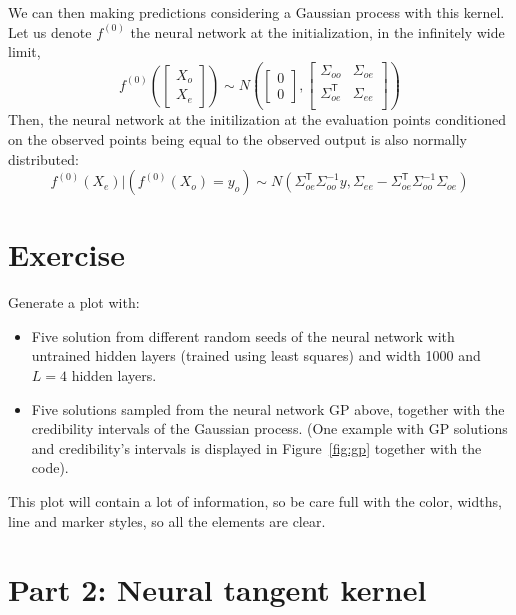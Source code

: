 \documentclass[a4paper,10pt]{article}
\newcommand{\trnsp}{\mathsf{T}}
\begin{document}
We can then making predictions considering a Gaussian process with this kernel. Let us denote $f^{(0)}$ the neural network at the initialization, in the infinitely wide limit,
\begin{equation}
\label{eq:nn-at-initialization}
f^{(0)}\left(\begin{bmatrix}
    X_o \\
    X_e
\end{bmatrix}\right)
\sim
N\left(\begin{bmatrix}
    0 \\
    0
\end{bmatrix}, \begin{bmatrix}
    \Sigma_{oo} & \Sigma_{oe} \\
    \Sigma_{oe}^\trnsp & \Sigma_{ee} \\
\end{bmatrix}\right)
\end{equation}
Then, the neural network at the initilization at the evaluation points conditioned on the observed points being equal to the observed output is also normally distributed:
$$f^{(0)}\left(
    X_e\right)
    | \left(f^{(0)}(  X_o) = y_o\right)
\sim
N\left(\Sigma_{oe}^\trnsp \Sigma_{oo}^{-1} y,
    \Sigma_{ee} - \Sigma_{oe}^\trnsp \Sigma_{oo}^{-1} \Sigma_{oe}\right)
$$

\section*{Exercise}
Generate a plot with:

\begin{itemize}
    \item Five solution from different random seeds of the neural network with untrained hidden layers (trained using least squares) and width 1000 and $L = 4$ hidden layers.
    \item Five solutions sampled from the neural network GP above, together with the credibility intervals of the Gaussian process. (One example with GP solutions and credibility's intervals is displayed in Figure~\ref{fig:gp} together with the code).
\end{itemize}

This plot will contain a lot of information, so be care full with the color, widths, line and marker styles, so all the elements are clear.

\section*{Part 2: Neural tangent kernel}
\end{document}

